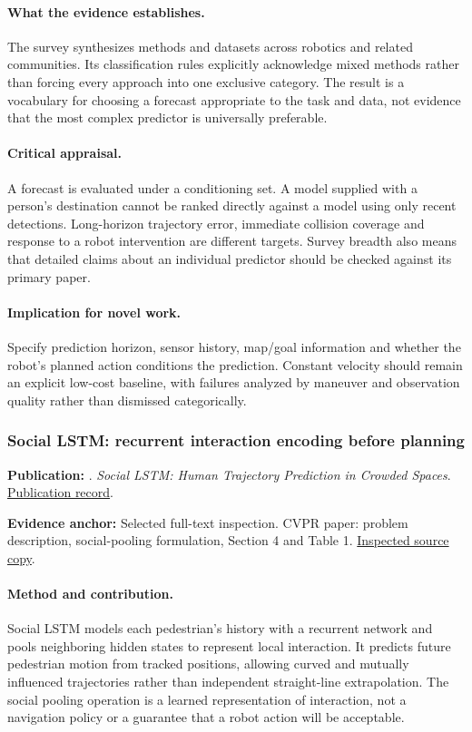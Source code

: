 \paragraph{What the evidence establishes.} The survey synthesizes methods and datasets across robotics and related communities. Its classification rules explicitly acknowledge mixed methods rather than forcing every approach into one exclusive category. The result is a vocabulary for choosing a forecast appropriate to the task and data, not evidence that the most complex predictor is universally preferable.

\paragraph{Critical appraisal.} A forecast is evaluated under a conditioning set. A model supplied with a person's destination cannot be ranked directly against a model using only recent detections. Long-horizon trajectory error, immediate collision coverage and response to a robot intervention are different targets. Survey breadth also means that detailed claims about an individual predictor should be checked against its primary paper.

\paragraph{Implication for novel work.} Specify prediction horizon, sensor history, map/goal information and whether the robot's planned action conditions the prediction. Constant velocity should remain an explicit low-cost baseline, with failures analyzed by maneuver and observation quality rather than dismissed categorically.

\subsubsection{Social LSTM: recurrent interaction encoding before planning}\label{paper:sociallstm}
\textbf{Publication:} \citet{sociallstm}. \emph{Social LSTM: Human Trajectory Prediction in Crowded Spaces}. \href{https://doi.org/10.1109/cvpr.2016.110}{Publication record}.

\textbf{Evidence anchor:} Selected full-text inspection. CVPR paper: problem description, social-pooling formulation, Section 4 and Table 1. \href{https://openaccess.thecvf.com/content_cvpr_2016/papers/Alahi_Social_LSTM_Human_CVPR_2016_paper.pdf}{Inspected source copy}.

\paragraph{Method and contribution.} Social LSTM models each pedestrian's history with a recurrent network and pools neighboring hidden states to represent local interaction. It predicts future pedestrian motion from tracked positions, allowing curved and mutually influenced trajectories rather than independent straight-line extrapolation. The social pooling operation is a learned representation of interaction, not a navigation policy or a guarantee that a robot action will be acceptable.

